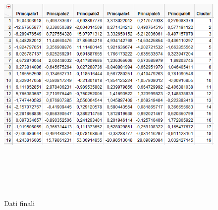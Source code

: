 \begin{figure}[!h]
	\centering
	\includegraphics[width=15cm, height=13cm]{./immagine/final_data.png}
	\caption{Dati finali}
	\label{fig:final_data}
\end{figure}

